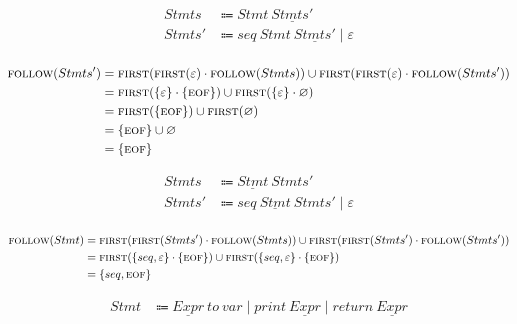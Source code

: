\documentclass{report}
\newcommand{\Empty}{\varnothing}
\newcommand{\Null}{\varepsilon}
\newcommand{\Seq}{\cdot}
\newcommand{\Spc}{\ }
\newcommand{\Union}{\mathrel{|}}
\newcommand{\FIRST}{\textsc{first}}
\newcommand{\FOLLOW}{\textsc{follow}}
\newcommand{\EOF}{\textsc{eof}}
\newcommand{\Arrow}{\Coloneq}
\newcommand{\NT}[1]{{#1}}
\newcommand{\T}[1]{{#1}}
\begin{document}
\begin{equation*}
  \begin{aligned}
    \NT{Stmts} &\Arrow \NT{Stmt} \Spc \underline{\NT{Stmts'}}\\
    \NT{Stmts'} &\Arrow \T{seq} \Spc \NT{Stmt} \Spc \underline{\NT{Stmts'}} \Union \Null\\
  \end{aligned}
\end{equation*}

\begin{equation*}
  \begin{aligned}
    \FOLLOW(\NT{Stmts}') &= \FIRST(\FIRST(\Null) \Seq \FOLLOW(\NT{Stmts})) \cup \FIRST(\FIRST(\Null) \Seq \FOLLOW(\NT{Stmts'}))\\
    &= \FIRST(\{\Null\} \Seq \{\EOF\}) \cup \FIRST(\{\Null\} \Seq \Empty)\\
    &= \FIRST(\{\EOF\}) \cup \FIRST(\Empty)\\
    &= \{\EOF\} \cup \Empty\\
    &= \{\EOF\}
  \end{aligned}
\end{equation*}

\begin{equation*}
  \begin{aligned}
    \NT{Stmts} &\Arrow \underline{\NT{Stmt}} \Spc \NT{Stmts'}\\
    \NT{Stmts'} &\Arrow \T{seq} \Spc \underline{\NT{Stmt}} \Spc \NT{Stmts'} \Union \Null\\
  \end{aligned}
\end{equation*}

\begin{equation*}
  \begin{aligned}
    \FOLLOW(\NT{Stmt}) &= \FIRST(\FIRST(\NT{Stmts'}) \Seq \FOLLOW(\NT{Stmts})) \cup \FIRST(\FIRST(\NT{Stmts'}) \Seq \FOLLOW(\NT{Stmts'})) \\
    &= \FIRST(\{\T{seq}, \Null\} \Seq \{\EOF\}) \cup \FIRST(\{\T{seq}, \Null\} \Seq \{\EOF\})\\
    &= \{\T{seq}, \EOF\}
  \end{aligned}
\end{equation*}

\begin{equation*}
  \begin{aligned}
    \NT{Stmt} &\Arrow \underline{\NT{Expr}} \Spc \T{to} \Spc \T{var} \Union \T{print} \Spc \underline{\NT{Expr}} \Union \NT{return} \Spc \underline{\NT{Expr}}\\
  \end{aligned}
\end{equation*}
\end{document}
